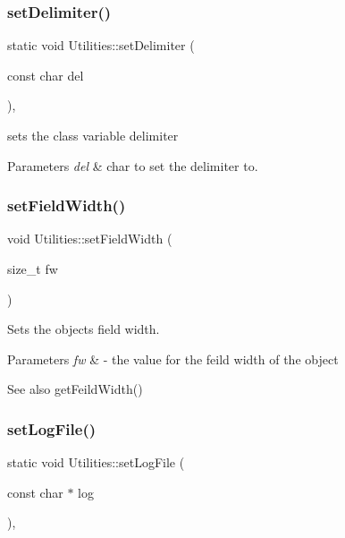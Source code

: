 \subsubsection{\texorpdfstring{set\+Delimiter()}{setDelimiter()}}
{\footnotesize\ttfamily static void Utilities\+::set\+Delimiter (\begin{DoxyParamCaption}\item[{const char}]{del }\end{DoxyParamCaption})\hspace{0.3cm}{\ttfamily [inline]}, {\ttfamily [static]}}



sets the class variable delimiter 


\begin{DoxyParams}{Parameters}
{\em del} & char to set the delimiter to. \\
\hline
\end{DoxyParams}
\mbox{\label{class_utilities_a90cee9218e3faff9bd060beda0e83e17}} 
\subsubsection{\texorpdfstring{set\+Field\+Width()}{setFieldWidth()}}
{\footnotesize\ttfamily void Utilities\+::set\+Field\+Width (\begin{DoxyParamCaption}\item[{size\+\_\+t}]{fw }\end{DoxyParamCaption})}



Sets the objects field width. 


\begin{DoxyParams}{Parameters}
{\em fw} & -\/ the value for the feild width of the object \\
\hline
\end{DoxyParams}
\begin{DoxySeeAlso}{See also}
get\+Feild\+Width() 
\end{DoxySeeAlso}
\mbox{\label{class_utilities_a4d03fd38f07e567277b82b8a0e030245}} 
\subsubsection{\texorpdfstring{set\+Log\+File()}{setLogFile()}}
{\footnotesize\ttfamily static void Utilities\+::set\+Log\+File (\begin{DoxyParamCaption}\item[{const char $\ast$}]{log }\end{DoxyParamCaption})\hspace{0.3cm}{\ttfamily [inline]}, {\ttfamily [static]}}



